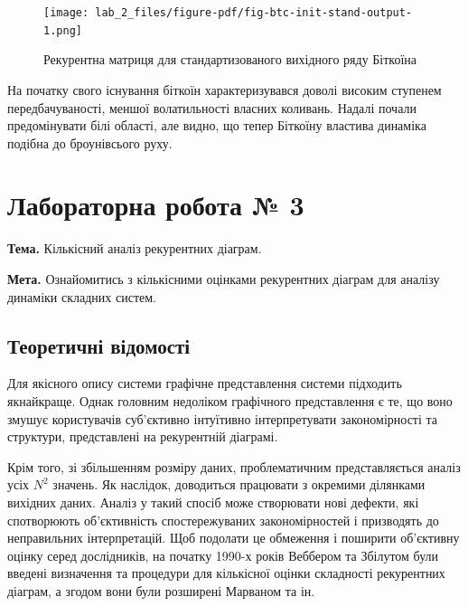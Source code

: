 \documentclass[
  letterpaper,
]{report}
\begin{document}
\begin{figure}[H]

{\centering \texttt{[image: lab\_2\_files/figure-pdf/fig-btc-init-stand-output-1.png]}

}

\caption{\label{fig-btc-init-stand}Рекурентна матриця для
стандартизованого вихідного ряду Біткоїна}

\end{figure}

На початку свого існування біткоїн характеризувався доволі високим
ступенем передбачуваності, меншої волатильності власних коливань. Надалі
почали предомінувати білі області, але видно, що тепер Біткоїну властива
динаміка подібна до броунівсього руху.


\hypertarget{ux43bux430ux431ux43eux440ux430ux442ux43eux440ux43dux430-ux440ux43eux431ux43eux442ux430-3}{%
\chapter{Лабораторна робота №
3}\label{ux43bux430ux431ux43eux440ux430ux442ux43eux440ux43dux430-ux440ux43eux431ux43eux442ux430-3}}

\textbf{Тема.} Кількісний аналіз рекурентних діаграм.

\textbf{Мета.} Ознайомитись з кількісними оцінками рекурентних діаграм
для аналізу динаміки складних систем.

\hypertarget{ux442ux435ux43eux440ux435ux442ux438ux447ux43dux456-ux432ux456ux434ux43eux43cux43eux441ux442ux456-2}{%
\section{Теоретичні
відомості}\label{ux442ux435ux43eux440ux435ux442ux438ux447ux43dux456-ux432ux456ux434ux43eux43cux43eux441ux442ux456-2}}

Для якісного опису системи графічне представлення системи підходить
якнайкраще. Однак головним недоліком графічного представлення є те, що
воно змушує користувачів суб'єктивно інтуїтивно інтерпретувати
закономірності та структури, представлені на рекурентній діаграмі.

Крім того, зі збільшенням розміру даних, проблематичним представляється
аналіз усіх \(N^2\) значень. Як наслідок, доводиться працювати з
окремими ділянками вихідних даних. Аналіз у такий спосіб може створювати
нові дефекти, які спотворюють об'єктивність спостережуваних
закономірностей і призводять до неправильних інтерпретацій. Щоб подолати
це обмеження і поширити об'єктивну оцінку серед дослідників, на початку
1990-х років Веббером та Збілутом були введені визначення та процедури
для кількісної оцінки складності рекурентних діаграм, а згодом вони були
розширені Марваном та ін.
\end{document}
